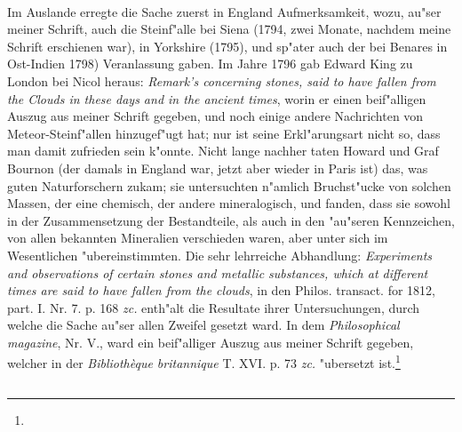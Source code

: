\documentclass[a4paper, 11pt, oneside, polutonikogreek, german]{article}
\begin{document}
\paragraph{}
Im Auslande erregte die Sache zuerst in England Aufmerksamkeit, wozu, au"ser meiner Schrift, auch die Steinf"alle bei Siena (1794, zwei Monate, nachdem meine Schrift erschienen war), in Yorkshire (1795), und sp"ater auch der bei Benares in Ost-Indien 1798) Veranlassung gaben. Im Jahre 1796 gab Edward King zu London bei Nicol heraus: \emph{Remark's concerning stones, said to have fallen from the Clouds in these days and in the ancient times}, worin er einen beif"alligen Auszug aus meiner Schrift gegeben, und noch einige andere Nachrichten von Meteor-Steinf"allen hinzugef"ugt hat; nur ist seine Erkl"arungsart nicht so, dass man damit zufrieden sein k"onnte. Nicht lange nachher taten Howard und Graf Bournon (der damals in England war, jetzt aber wieder in Paris ist) das, was guten Naturforschern zukam; sie untersuchten n"amlich Bruchst"ucke von solchen Massen, der eine chemisch, der andere mineralogisch, und fanden, dass sie sowohl in der Zusammensetzung der Bestandteile, als auch in den "au"seren Kennzeichen, von allen bekannten Mineralien verschieden waren, aber unter sich im Wesentlichen "ubereinstimmten. Die sehr lehrreiche Abhandlung: \emph{Experiments and observations of certain stones and metallic substances, which at different times are said to have fallen from the clouds}, in den Philos. transact. for 1812, part. I. Nr. 7. p. 168 \emph{zc.} enth"alt die Resultate ihrer Untersuchungen, durch welche die Sache au"ser allen Zweifel gesetzt ward. In dem \emph{Philosophical magazine}, Nr. V., ward ein beif"alliger Auszug aus meiner Schrift gegeben, welcher in der \emph{Bibliothèque britannique} T. XVI. p. 73 \emph{zc.} "ubersetzt ist.\footnote{}
\subsection{}
\end{document}
